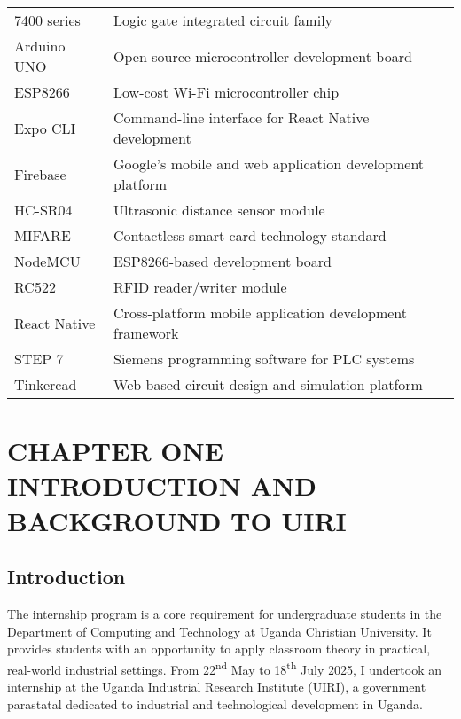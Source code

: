 \documentclass[12pt,a4paper]{report}
\renewcommand{\headrulewidth}{0pt}
\begin{document}
\begin{tabular}{ll}
7400 series & Logic gate integrated circuit family \\
Arduino UNO & Open-source microcontroller development board \\
ESP8266 & Low-cost Wi-Fi microcontroller chip \\
Expo CLI & Command-line interface for React Native development \\
Firebase & Google's mobile and web application development platform \\
HC-SR04 & Ultrasonic distance sensor module \\
MIFARE & Contactless smart card technology standard \\
NodeMCU & ESP8266-based development board \\
RC522 & RFID reader/writer module \\
React Native & Cross-platform mobile application development framework \\
STEP 7 & Siemens programming software for PLC systems \\
Tinkercad & Web-based circuit design and simulation platform \\
\end{tabular}

\newpage

\fancyhf{}  %

  \fancypagestyle{plain}{%
  \fancyhf{}  %
  \renewcommand{\headrulewidth}{0pt}
  \fancyfoot[R]{Page \thepage}  %
} 

\chapter[CHAPTER ONE INTRODUCTION AND BACKGROUND TO UIRI]{CHAPTER ONE \\INTRODUCTION AND BACKGROUND TO UIRI}

\section{Introduction}
\noindent The internship program is a core requirement for undergraduate students in the Department of Computing and Technology at Uganda Christian University. It provides students with an opportunity to apply classroom theory in practical, real-world industrial settings. From 22\textsuperscript{nd} May to 18\textsuperscript{th} July 2025, I undertook an internship at the Uganda Industrial Research Institute (UIRI), a government parastatal dedicated to industrial and technological development in Uganda.
\end{document}
